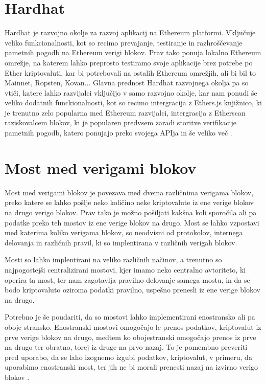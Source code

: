 \documentclass[a4paper,12pt,openright]{book}
\begin{document}
\section{Hardhat}
Hardhat je razvojno okolje za razvoj aplikacij na Ethereum platformi.
Vključuje veliko funkcionalnosti, kot so recimo prevajanje, testiranje in razhroščevanje pametnih pogodb na Ethereum verigi blokov.
Prav tako ponuja lokalno Ethereum omrežje, na katerem lahko preprosto testiramo svoje aplikacije brez potrebe po Ether kriptovaluti, kar bi potrebovali na ostalih Ethereum omrežjih, ali bi bil to Mainnet, Ropsten, Kovan...
Glavna prednost Hardhat razvojnega okolja pa so vtiči, katere lahko razvijalci vključijo v samo razvojno okolje, kar nam ponudi še veliko dodatnih funckionalnosti, kot so recimo intergracija z Ethers.js knjižnico, ki je trenutno zelo popularna med Ethereum razvijalci, intergracija z Etherscan raziskovalcem blokov, ki je popularen predvsem zaradi storitve verifikacije pametnih pogodb, katero ponujajo preko svojega APIja in še veliko več \cite{hardhat_docs}.

\section{Most med verigami blokov}
Most med verigami blokov je povezava med dvema različnima verigama blokov, preko katere se lahko pošlje neko količino neke kriptovalute iz ene verige blokov na drugo verigo blokov.
Prav tako je možno pošiljati kakšna koli sporočila ali pa podatke preko teh mostov iz ene verige blokov na drugo.
Most se lahko vzpostavi med katerima koliko verigama blokov, so neodvisni od protokolov, internega delovanja in različnih pravil, ki so implentirana v različnih verigah blokov.

Mosti so lahko implentirani na veliko različnih načinov, a trenutno so najpogostejši centralizirani mostovi, kjer imamo neko centralno avtoriteto, ki operira ta most, ter nam zagotavlja pravilno delovanje samega mostu, in da se bodo kriptovaluto oziroma podatki pravilno, uspešno prenesli iz ene verige blokov na drugo.

Potrebno je še poudariti, da so mostovi lahko implementirani enostransko ali pa oboje stransko.
Enostranski mostovi omogočajo le prenos podatkov, kriptovalut iz prve verige blokov na drugo, medtem ko obojestranski omogočajo prenos iz prve na drugo ter obratno, torej iz druge na prvo nazaj.
To je pomembno preveriti pred uporabo, da se laho izognemo izgubi podatkov, kriptovalut, v primeru, da uporabimo enostranski most, ter jih ne bi morali prenesti nazaj na izvirno verigo blokov \cite{blockchain_bridges_coinmarketcap}.
\end{document}
